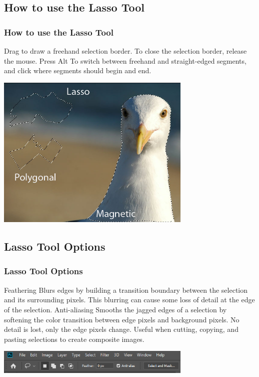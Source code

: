 \documentclass{beamer}
\begin{document}
\subsection{How to use the Lasso Tool}		
\begin{frame}
	\frametitle{How to use the Lasso Tool}
	\begin{outline}
		\1 Drag to draw a freehand selection border.
		\1 To close the selection border, release the mouse.
		\1 Press Alt To switch between freehand and straight-edged segments, and click where segments should begin and end. 
	\end{outline}
	\begin{center}
	\includegraphics[width = 0.7\textwidth]{images/lasso_samples.jpg}
\end{center}
\end{frame}

\subsection{Lasso Tool Options}		
\begin{frame}
	\frametitle{Lasso Tool Options}
	\begin{outline}
		\1 Feathering
		\2 Blurs edges by building a transition boundary between the selection and its surrounding pixels. 
		\3 This blurring can cause some loss of detail at the edge of the selection.
		\1 Anti-aliasing
		\2 Smooths the jagged edges of a selection by softening the color transition between edge pixels and background pixels. 
		\3 No detail is lost, only the edge pixels change. 
		\3 Useful when cutting, copying, and pasting selections to create composite images.
	\end{outline}
	\begin{center}
		\includegraphics[width = 0.7\textwidth]{images/Lasso Options.png}
	\end{center}
\end{frame}
\end{document}
